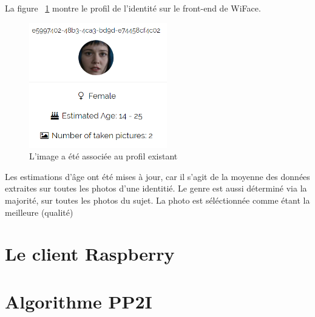 La figure ~\ref{fig:ramona_profile} montre le profil de l'identité sur le front-end de WiFace.
\begin{figure}[H]
	\centering
	\includegraphics[width=6cm]{images/facial_reco/ramona_profile.png}
    \caption{L'image a été associée au profil existant}
	\label{fig:ramona_profile}
\end{figure}

Les estimations d'âge ont été mises à jour, car il s'agit de la moyenne des données extraites sur toutes les photos d'une identitié.
Le genre est aussi déterminé via la majorité, sur toutes les photos du sujet. 
La photo est séléctionnée comme étant la meilleure (qualité)
\section{Le client Raspberry}

\section{Algorithme PP2I}